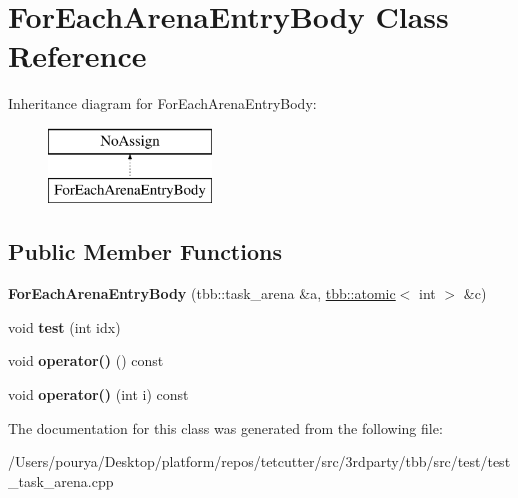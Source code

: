 \hypertarget{classForEachArenaEntryBody}{}\section{For\+Each\+Arena\+Entry\+Body Class Reference}
\label{classForEachArenaEntryBody}
Inheritance diagram for For\+Each\+Arena\+Entry\+Body\+:\begin{figure}[H]
\begin{center}
\leavevmode
\includegraphics[height=2.000000cm]{classForEachArenaEntryBody}
\end{center}
\end{figure}
\subsection*{Public Member Functions}
\begin{DoxyCompactItemize}
\item 
\hypertarget{classForEachArenaEntryBody_a5b304ae0927b5970bcedbc1fd4650c29}{}{\bfseries For\+Each\+Arena\+Entry\+Body} (tbb\+::task\+\_\+arena \&a, \hyperlink{structtbb_1_1atomic}{tbb\+::atomic}$<$ int $>$ \&c)\label{classForEachArenaEntryBody_a5b304ae0927b5970bcedbc1fd4650c29}

\item 
\hypertarget{classForEachArenaEntryBody_a1b18e5d71dfd5d1b755f182103573e2a}{}void {\bfseries test} (int idx)\label{classForEachArenaEntryBody_a1b18e5d71dfd5d1b755f182103573e2a}

\item 
\hypertarget{classForEachArenaEntryBody_a9dff5007ce39e6a9c7d3f92ab44d1c85}{}void {\bfseries operator()} () const \label{classForEachArenaEntryBody_a9dff5007ce39e6a9c7d3f92ab44d1c85}

\item 
\hypertarget{classForEachArenaEntryBody_a7cb10f173be89dcb78365ca1a527df51}{}void {\bfseries operator()} (int i) const \label{classForEachArenaEntryBody_a7cb10f173be89dcb78365ca1a527df51}

\end{DoxyCompactItemize}


The documentation for this class was generated from the following file\+:\begin{DoxyCompactItemize}
\item 
/\+Users/pourya/\+Desktop/platform/repos/tetcutter/src/3rdparty/tbb/src/test/test\+\_\+task\+\_\+arena.\+cpp\end{DoxyCompactItemize}
